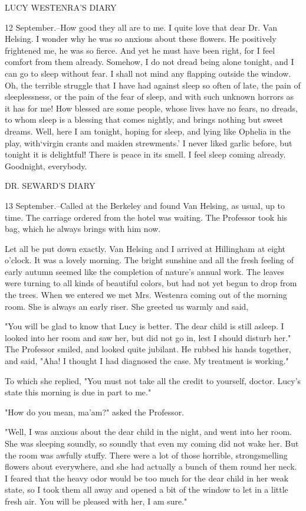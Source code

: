 LUCY WESTENRA'S DIARY 

12 September.--How good they all are to me. I quite love that dear Dr. Van Helsing. I wonder why he was so anxious about these flowers. He positively frightened me, he was so fierce. And yet he must have been right, for I feel comfort from them already. Somehow, I do not dread being alone tonight, and I can go to sleep without fear. I shall not mind any flapping outside the window. Oh, the terrible struggle that I have had against sleep so often of late, the pain of sleeplessness, or the pain of the fear of sleep, and with such unknown horrors as it has for me! How blessed are some people, whose lives have no fears, no dreads, to whom sleep is a blessing that comes nightly, and brings nothing but sweet dreams. Well, here I am tonight, hoping for sleep, and lying like Ophelia in the play, with`virgin crants and maiden strewments.' I never liked garlic before, but tonight it is delightful! There is peace in its smell. I feel sleep coming already. Goodnight, everybody. 

DR. SEWARD'S DIARY 

13 September.--Called at the Berkeley and found Van Helsing, as usual, up to time. The carriage ordered from the hotel was waiting. The Professor took his bag, which he always brings with him now. 

Let all be put down exactly. Van Helsing and I arrived at Hillingham at eight o'clock. It was a lovely morning. The bright sunshine and all the fresh feeling of early autumn seemed like the completion of nature's annual work. The leaves were turning to all kinds of beautiful colors, but had not yet begun to drop from the trees. When we entered we met Mrs. Westenra coming out of the morning room. She is always an early riser. She greeted us warmly and said, 

"You will be glad to know that Lucy is better. The dear child is still asleep. I looked into her room and saw her, but did not go in, lest I should disturb her." The Professor smiled, and looked quite jubilant. He rubbed his hands together, and said, "Aha! I thought I had diagnosed the case. My treatment is working." 

To which she replied, "You must not take all the credit to yourself, doctor. Lucy's state this morning is due in part to me." 

"How do you mean, ma'am?" asked the Professor. 

"Well, I was anxious about the dear child in the night, and went into her room. She was sleeping soundly, so soundly that even my coming did not wake her. But the room was awfully stuffy. There were a lot of those horrible, strongsmelling flowers about everywhere, and she had actually a bunch of them round her neck. I feared that the heavy odor would be too much for the dear child in her weak state, so I took them all away and opened a bit of the window to let in a little fresh air. You will be pleased with her, I am sure." 


